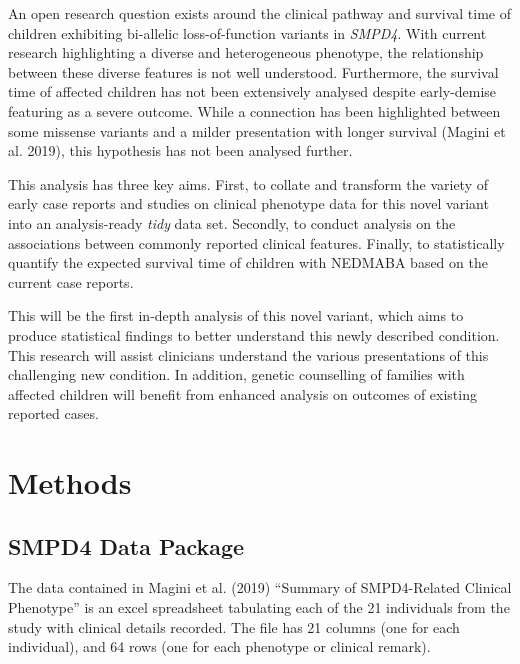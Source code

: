 \documentclass[
  letterpaper,
  DIV=11,
  numbers=noendperiod]{scrartcl}
\begin{document}
An open research question exists around the clinical pathway and
survival time of children exhibiting bi-allelic loss-of-function
variants in \emph{SMPD4}. With current research highlighting a diverse
and heterogeneous phenotype, the relationship between these diverse
features is not well understood. Furthermore, the survival time of
affected children has not been extensively analysed despite early-demise
featuring as a severe outcome. While a connection has been highlighted
between some missense variants and a milder presentation with longer
survival (Magini et al. 2019), this hypothesis has not been analysed
further.

This analysis has three key aims. First, to collate and transform the
variety of early case reports and studies on clinical phenotype data for
this novel variant into an analysis-ready \emph{tidy} data set.
Secondly, to conduct analysis on the associations between commonly
reported clinical features. Finally, to statistically quantify the
expected survival time of children with NEDMABA based on the current
case reports.

This will be the first in-depth analysis of this novel variant, which
aims to produce statistical findings to better understand this newly
described condition. This research will assist clinicians understand the
various presentations of this challenging new condition. In addition,
genetic counselling of families with affected children will benefit from
enhanced analysis on outcomes of existing reported cases.

\hypertarget{methods}{%
\section{Methods}\label{methods}}

\hypertarget{smpd4-data-package}{%
\subsection{SMPD4 Data Package}\label{smpd4-data-package}}

The data contained in Magini et al. (2019) ``Summary of SMPD4-Related
Clinical Phenotype'' is an excel spreadsheet tabulating each of the 21
individuals from the study with clinical details recorded. The file has
21 columns (one for each individual), and 64 rows (one for each
phenotype or clinical remark).
\end{document}
